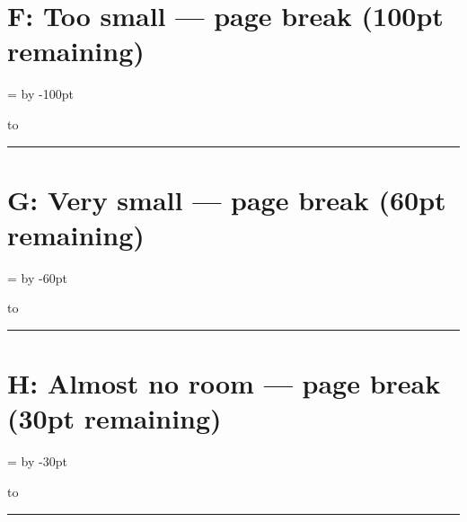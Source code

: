 \documentclass[a4paper,11pt]{article}
\begin{document}
\newpage
\section*{F: Too small — page break (100pt remaining)}

\pbht=\textheight
\advance\pbht by -100pt

\vbox to\pbht{%
  \lipsum[1-2]%
  \vss
}%

\begin{swarmwrap}%
  \begin{minipage}[t]{3cm}
    \centering
    \rule{\linewidth}{2.5cm}
  \end{minipage}%
\end{swarmwrap}%
\swarmwrapnext
\lipsum[1]

\newpage
\section*{G: Very small — page break (60pt remaining)}

\pbht=\textheight
\advance\pbht by -60pt

\vbox to\pbht{%
  \lipsum[1-2]%
  \vss
}%

\begin{swarmwrap}%
  \begin{minipage}[t]{3cm}
    \centering
    \rule{\linewidth}{2.5cm}
  \end{minipage}%
\end{swarmwrap}%
\swarmwrapnext
\lipsum[1]

\newpage
\section*{H: Almost no room — page break (30pt remaining)}

\pbht=\textheight
\advance\pbht by -30pt

\vbox to\pbht{%
  \lipsum[1-2]%
  \vss
}%

\begin{swarmwrap}%
  \begin{minipage}[t]{3cm}
    \centering
    \rule{\linewidth}{2.5cm}
  \end{minipage}%
\end{swarmwrap}%
\swarmwrapnext
\lipsum[1]
\end{document}
